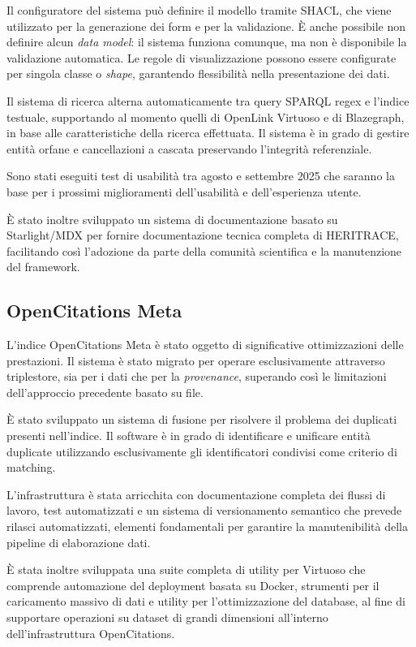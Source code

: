\documentclass[11pt,a4paper]{article}
\begin{document}
Il configuratore del sistema può definire il modello tramite SHACL, che viene utilizzato per la generazione dei form e per la validazione. È anche possibile non definire alcun \textit{data model}: il sistema funziona comunque, ma non è disponibile la validazione automatica. Le regole di visualizzazione possono essere configurate per singola classe o \textit{shape}, garantendo flessibilità nella presentazione dei dati.

Il sistema di ricerca alterna automaticamente tra query SPARQL regex e l'indice testuale, supportando al momento quelli di OpenLink Virtuoso e di Blazegraph, in base alle caratteristiche della ricerca effettuata. Il sistema è in grado di gestire entità orfane e cancellazioni a cascata preservando l'integrità referenziale.

Sono stati eseguiti test di usabilità tra agosto e settembre 2025 che saranno la base per i prossimi miglioramenti dell'usabilità e dell'esperienza utente.

È stato inoltre sviluppato un sistema di documentazione basato su Starlight/MDX per fornire documentazione tecnica completa di HERITRACE, facilitando così l'adozione da parte della comunità scientifica e la manutenzione del framework.

\subsection{OpenCitations Meta}

L'indice OpenCitations Meta è stato oggetto di significative ottimizzazioni delle prestazioni. Il sistema è stato migrato per operare esclusivamente attraverso triplestore, sia per i dati che per la \textit{provenance}, superando così le limitazioni dell'approccio precedente basato su file.

È stato sviluppato un sistema di fusione per risolvere il problema dei duplicati presenti nell'indice. Il software è in grado di identificare e unificare entità duplicate utilizzando esclusivamente gli identificatori condivisi come criterio di matching.

L'infrastruttura è stata arricchita con documentazione completa dei flussi di lavoro, test automatizzati e un sistema di versionamento semantico che prevede rilasci automatizzati, elementi fondamentali per garantire la manutenibilità della pipeline di elaborazione dati.

È stata inoltre sviluppata una suite completa di utility per Virtuoso che comprende automazione del deployment basata su Docker, strumenti per il caricamento massivo di dati e utility per l'ottimizzazione del database, al fine di supportare operazioni su dataset di grandi dimensioni all'interno dell'infrastruttura OpenCitations.
\end{document}
